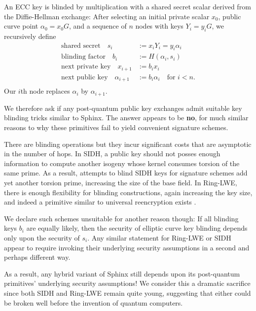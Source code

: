 \documentclass[twoside,letterpaper]{sig-alternate}
\def\mathcomma{,}
\def\mathcomma{}
\begin{document}
An ECC key is blinded by multiplication with a shared secret scalar
derived from the Diffie-Hellman exchange:
After selecting an initial private scalar $x_0$,
 public curve point $\alpha_0 = x_0 G$, and 
 a sequence of $n$ nodes with keys $Y_i = y_i G$,
we recursively define 
\[ \begin{aligned}
\textrm{shared secret}\quad
 s_i &:= x_i Y_i = y_i \alpha_i \mathcomma \\
\textrm{blinding factor}\quad
 b_i &:= H(\alpha_i,s_i) \mathcomma \\
\textrm{next private key}\quad
 x_{i+1} &:= b_i x_i \mathcomma \\ %
\textrm{next public key}\quad
 \alpha_{i+1} &:= b_i \alpha_i \quad\textrm{for $i < n$.} \\
\end{aligned} \]
Our $i$th node replaces $\alpha_i$ by $\alpha_{i+1}$.

\smallskip

We therefore ask if any post-quantum public key exchanges admit 
suitable key blinding tricks similar to Sphinx. 
The answer appears to be {\bf no}, for much similar reasons to 
why these primitives fail to yield convenient signature schemes. 

There are blinding operations but they incur significant costs 
that are asymptotic in the number of hops.
%
In SIDH, a public key should not posses enough information to compute
another isogeny whose kernel consumes torsion of the same prime. 
As a result, attempts to blind SIDH keys for signature schemes add
yet another torsion prime, increasing the size of the base field.
%
In Ring-LWE, there is enough flexibility for blinding constructions,
again increasing the key size, and indeed a primitive similar to
universal reencryption exists \cite{963628}.

We declare such schemes unsuitable for another reason though: 
%
If all blinding keys $b_i$ are equally likely, then the security of
elliptic curve key blinding depends only upon the security of $s_i$.
%
Any similar statement for Ring-LWE or SIDH appear to require invoking
their underlying security assumptions in a second and perhaps different way.

As a result, any hybrid variant of Sphinx still depends upon its
post-quantum primitives' underlying security assumptions! 
%
We consider this a dramatic sacrifice since both SIDH and Ring-LWE
remain quite young, suggesting that either could be broken well
 before the invention of quantum computers.
\end{document}
